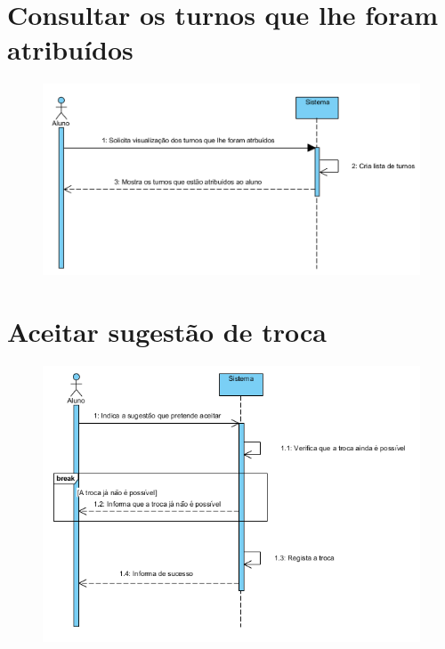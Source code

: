 \documentclass[12pt,a4paper]{report}
\begin{document}
\begin{appendices}
\section{Consultar os turnos que lhe foram atribuídos}
\begin{figure}[H]
	\centering 
	\includegraphics[width=\textwidth]{modelacao/use_case_diagram/ConsultarTurnosAtribuidos.png}  
\end{figure}

\section{Aceitar sugestão de troca}
\begin{figure}[H]
	\centering 
	\includegraphics[width=\textwidth]{modelacao/use_case_diagram/AceitarSugestaoTroca.png}  
\end{figure}


\end{appendices}
\end{document}

